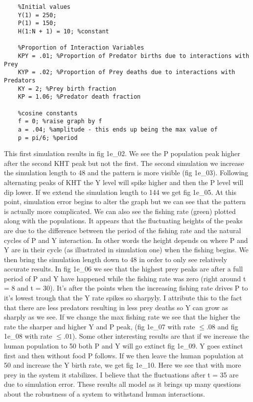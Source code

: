 \documentclass{article}
\begin{document}
  \begin{verbatim}
    %Initial values
    Y(1) = 250;
    P(1) = 150;
    H(1:N + 1) = 10; %constant

    %Proportion of Interaction Variables
    KPY = .01; %Proportion of Predator births due to interactions with Prey
    KYP = .02; %Proportion of Prey deaths due to interactions with Predators
    KY = 2; %Prey birth fraction
    KP = 1.06; %Predator death fraction

    %cosine constants
    f = 0; %raise graph by f
    a = .04; %amplitude - this ends up being the max value of
    p = pi/6; %period
  \end{verbatim}
  This first simulation results in fig 1e\_02. We see the P population peak higher
  after the second KHT peak but not the first. The second simulation we increase the
  simulation length to 48 and the pattern is more visible (fig 1e\_03). Following alternating
  peaks of KHT the Y level will spike higher and then the P level will dip lower. If we
  extend the simulation length to 144 we get fig 1e\_05. At this point, simulation error
  begins to alter the graph but we can see that the pattern is actually more complicated.
  We can also see the fishing rate (green) plotted along with the populations. It appears
  that the fluctuating heights of the peaks are due to the difference between the period of
  the fishing rate and the natural cycles of P and Y interaction. In other words the height
  depends on where
  P and Y are in their cycle (as illustrated in simulation one) when the fishing begins.
  We then bring the simulation length down to 48 in order to only see relatively
  accurate results. In fig 1e\_06 we see that the highest prey peaks are after
  a full period of P and Y have happened while the fishing rate was zero
  (right around t = 8 and t = 30). It's after the points when the increasing fishing rate
  drives P to it's lowest trough that the Y rate spikes so sharpyly. I attribute this to
  the fact that there are less predators resulting in less prey deaths so Y can grow
  as sharply as we see. If we change the max fishing rate we see that the higher the rate
  the sharper and higher Y and P peak, (fig 1e\_07 with rate $\le .08$ and fig 1e\_08 with
  rate $\le .01$). Some other interesting results are that if we increase the human population to
  50 both P and Y will go extinct fig 1e\_09. Y goes extinct first and then without food
  P follows. If we then leave the human population at 50 and increase the Y birth rate, we
  get fig 1e\_10. Here we see that with more prey in the system it stabilizes. I believe that
  the fluctuations after t = 35 are due to simulation error. These results all model
  as it brings up many questions about the robustness of a system to withstand human interactions.
\end{document}
